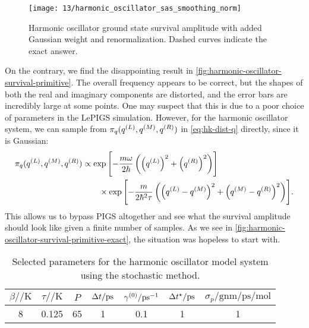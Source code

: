 \begin{figure}
	\centering
	\texttt{[image: 13/harmonic\_oscillator\_sas\_smoothing\_norm]}
	\caption[
		Harmonic oscillator survival amplitude with added Gaussian weight
	]{
		Harmonic oscillator ground state survival amplitude with added Gaussian weight and renormalization.
		Dashed curves indicate the exact answer.
	}
	\label{fig:harmonic-oscillator-survival-smoothing-norm}
\end{figure}

On the contrary, we find the disappointing result in \cref{fig:harmonic-oscillator-survival-primitive}.
The overall frequency appears to be correct, but the shapes of both the real and imaginary components are distorted, and the error bars are incredibly large at some points.
One may suspect that this is due to a poor choice of parameters in the LePIGS simulation.
However, for the harmonic oscillator system, we can sample from $\pi_q(q^{(L)}, q^{(M)}, q^{(R)})$ in \cref{eq:hk-dist-q} directly, since it is Gaussian:
\begin{align}
	\pi_q(q^{(L)}, q^{(M)}, q^{(R)})
	&\propto \exp{\left[ 
			-\frac{m \omega}{2 \hbar} \left( \left( q^{(L)}\right)^2 + \left( q^{(R)}\right)^2 \right)
		 \right]} \notag \\
	&\qquad\times
		\exp{\left[ 
			-\frac{m}{2 \hbar^2 \tau} \left( \left( q^{(L)}- q^{(M)}\right)^2 + \left( q^{(M)}- q^{(R)}\right)^2 \right)
		 \right]}.
\end{align}
This allows us to bypass PIGS altogether and see what the survival amplitude should look like given a finite number of samples.
As we see in \cref{fig:harmonic-oscillator-survival-primitive-exact}, the situation was hopeless to start with.

\begin{table}
	\begin{center}
	\begin{tabular}{ c c c c c c c }
		\toprule
		{$\beta / \si{\per\kelvin}$} & {$\tau / \si{\per\kelvin}$} & {$P$} & {$\dt / \si{\pico\second}$} & $\gamma\bead{0} / \si{\per\pico\second}$ & {$\dt\alt / \si{\pico\second}$} & {$\sigma_p / \si{\gram\nano\meter\per\pico\second\per\mole}$} \\
		\midrule
		8 & 0.125 & 65 & 1 & 0.1 & 1 & 1 \\
		\bottomrule
	\end{tabular}
	\end{center}
	\caption[
		Selected parameters for harmonic oscillator (stochastic)
	]{
		Selected parameters for the harmonic oscillator model system using the stochastic method.
	}
	\label{tab:model-sas-harmonic-oscillator-stochastic}
\end{table}

